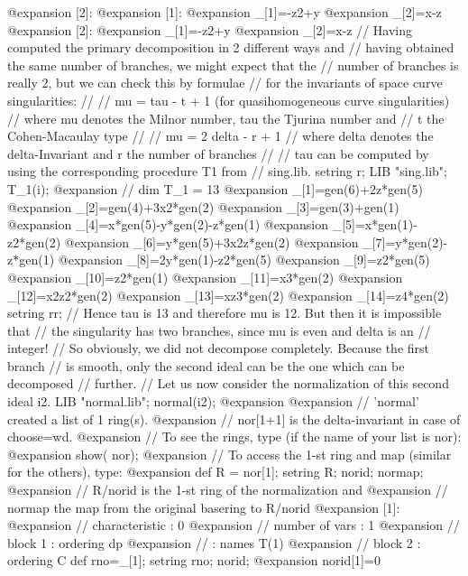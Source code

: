 @expansion{} [2]:
@expansion{}    [1]:
@expansion{}       _[1]=-z2+y
@expansion{}       _[2]=x-z
@expansion{}    [2]:
@expansion{}       _[1]=-z2+y
@expansion{}       _[2]=x-z
  // Having computed the primary decomposition in 2 different ways and
  // having obtained the same number of branches, we might expect that the
  // number of branches is really 2, but we can check this by formulae
  // for the invariants of space curve singularities:
  //
  // mu = tau - t + 1 (for quasihomogeneous curve singularities)
  // where mu denotes the Milnor number, tau the Tjurina number and
  // t the Cohen-Macaulay type
  //
  // mu = 2 delta - r + 1
  // where delta denotes the delta-Invariant and r the number of branches
  //
  // tau can be computed by using the corresponding procedure T1 from
  // sing.lib.
  setring r;
  LIB "sing.lib";
  T_1(i);
@expansion{} // dim T_1 = 13
@expansion{} _[1]=gen(6)+2z*gen(5)
@expansion{} _[2]=gen(4)+3x2*gen(2)
@expansion{} _[3]=gen(3)+gen(1)
@expansion{} _[4]=x*gen(5)-y*gen(2)-z*gen(1)
@expansion{} _[5]=x*gen(1)-z2*gen(2)
@expansion{} _[6]=y*gen(5)+3x2z*gen(2)
@expansion{} _[7]=y*gen(2)-z*gen(1)
@expansion{} _[8]=2y*gen(1)-z2*gen(5)
@expansion{} _[9]=z2*gen(5)
@expansion{} _[10]=z2*gen(1)
@expansion{} _[11]=x3*gen(2)
@expansion{} _[12]=x2z2*gen(2)
@expansion{} _[13]=xz3*gen(2)
@expansion{} _[14]=z4*gen(2)
  setring rr;
  // Hence tau is 13 and therefore mu is 12. But then it is impossible that
  // the singularity has two branches, since mu is even and delta is an
  // integer!
  // So obviously, we did not decompose completely. Because the first branch
  // is smooth, only the second ideal can be the one which can be decomposed
  // further.
  // Let us now consider the normalization of this second ideal i2.
  LIB "normal.lib";
  normal(i2);
@expansion{} 
@expansion{} // 'normal' created a list of 1 ring(s).
@expansion{} // nor[1+1] is the delta-invariant in case of choose=wd.
@expansion{} // To see the rings, type (if the name of your list is nor):
@expansion{}      show( nor);
@expansion{} // To access the 1-st ring and map (similar for the others), type:
@expansion{}      def R = nor[1]; setring R;  norid; normap;
@expansion{} // R/norid is the 1-st ring of the normalization and
@expansion{} // normap the map from the original basering to R/norid
@expansion{} [1]:
@expansion{}    //   characteristic : 0
@expansion{} //   number of vars : 1
@expansion{} //        block   1 : ordering dp
@expansion{} //                  : names    T(1) 
@expansion{} //        block   2 : ordering C
  def rno=_[1];
  setring rno;
  norid;
@expansion{} norid[1]=0
